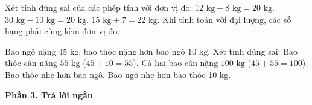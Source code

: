 \begin{ex} %
Xét tính đúng sai của các phép tính với đơn vị đo:
\choiceTF
{\True $12\text{ kg} + 8\text{ kg} = 20\text{ kg}$.}
{\True $30\text{ kg} - 10\text{ kg} = 20\text{ kg}$.}
{$15\text{ kg} + 7 = 22\text{ kg}$.}
{\True Khi tính toán với đại lượng, các số hạng phải cùng kèm đơn vị đo.}
\end{ex}

\begin{ex} %
Bao ngô nặng $45\text{ kg}$, bao thóc nặng hơn bao ngô $10\text{ kg}$. Xét tính đúng sai:
\choiceTF
{\True Bao thóc cân nặng $55\text{ kg}$ ($45 + 10 = 55$).}
{\True Cả hai bao cân nặng $100\text{ kg}$ ($45 + 55 = 100$).}
{Bao thóc nhẹ hơn bao ngô.}
{\True Bao ngô nhẹ hơn bao thóc 10 kg.}
\end{ex}

\textbf{Phần 3. Trả lời ngắn}

